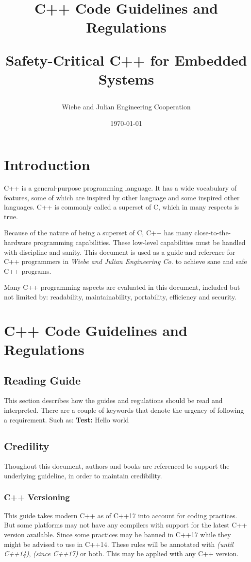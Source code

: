 \documentclass[12pt]{article}
\title{
      C++ Code Guidelines and Regulations \\
      \begin{large}
         Safety-Critical C++ for Embedded Systems
      \end{large}
}
\date{\today}
\author{Wiebe and Julian Engineering Cooperation}
\newcommand{\cppuntil}[1]{\footnotesize\textit{(until C++#1)}\normalsize}
\newcommand{\cppsince}[1]{\footnotesize\textit{(since C++#1)}\normalsize}
\begin{document}
\maketitle

\newpage
{} %
\tableofcontents
\newpage
{} %

\newpage
\section{Introduction}
C++ is a general-purpose programming language. It has a wide vocabulary of
features, some of which are inspired by other language and some inspired other
languages. C++ is commonly called a superset of C, which in many respects
is true.

Because of the nature of being a superset of C, C++ has many
close-to-the-hardware programming capabilities. These low-level capabilities
must be handled with discipline and sanity. This document is used as a guide
and reference for C++ programmers in \textit{Wiebe and Julian Engineering Co.}
to achieve sane and safe C++ programs.

Many C++ programming aspects are evaluated in this document, included but not
limited by: readability, maintainability, portability, efficiency and security.
\newpage
\section{C++ Code Guidelines and Regulations}
\subsection{Reading Guide}
This section describes how the guides and regulations should be read and
interpreted. There are a couple of keywords that denote the urgency of
following a requirement. Such as:
\bigbreak
\textbf{Test:} Hello world
\subsection{Credility}
Thoughout this document, authors and books are referenced to support the
underlying guideline, in order to maintain credibility.
\subsubsection{C++ Versioning}
This guide takes modern C++ as of C++17 into account for coding practices. But
some platforms may not have any compilers with support for the latest C++
version available. Since some practices may be banned in C++17 while they might
be advised to use in C++14. These rules will be annotated with \cppuntil{14},
\cppsince{17} or both. This may be applied with any C++ version.

\newpage
\printbibliography

\newpage
\begin{appendix}
\end{appendix}
\end{document}
